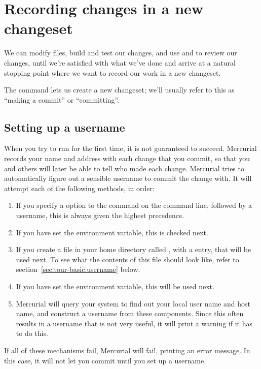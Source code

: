 \section{Recording changes in a new changeset}

We can modify files, build and test our changes, and use
 and  to review our changes, until we're
satisfied with what we've done and arrive at a natural stopping point
where we want to record our work in a new changeset.

The  command lets us create a new changeset; we'll
usually refer to this as ``making a commit'' or ``committing''.  

\subsection{Setting up a username}

When you try to run  for the first time, it is not
guaranteed to succeed.  Mercurial records your name and address with
each change that you commit, so that you and others will later be able
to tell who made each change.  Mercurial tries to automatically figure
out a sensible username to commit the change with.  It will attempt
each of the following methods, in order:
\begin{enumerate}
\item If you specify a  option to the 
  command on the command line, followed by a username, this is always
  given the highest precedence.
\item If you have set the  environment variable, this is
  checked next.
\item If you create a file in your home directory called
  , with a  entry, that will be
  used next.  To see what the contents of this file should look like,
  refer to section~\ref{sec:tour-basic:username} below.
\item If you have set the  environment variable, this
  will be used next.
\item Mercurial will query your system to find out your local user
  name and host name, and construct a username from these components.
  Since this often results in a username that is not very useful, it
  will print a warning if it has to do this.
\end{enumerate}
If all of these mechanisms fail, Mercurial will fail, printing an
error message.  In this case, it will not let you commit until you set
up a username.

